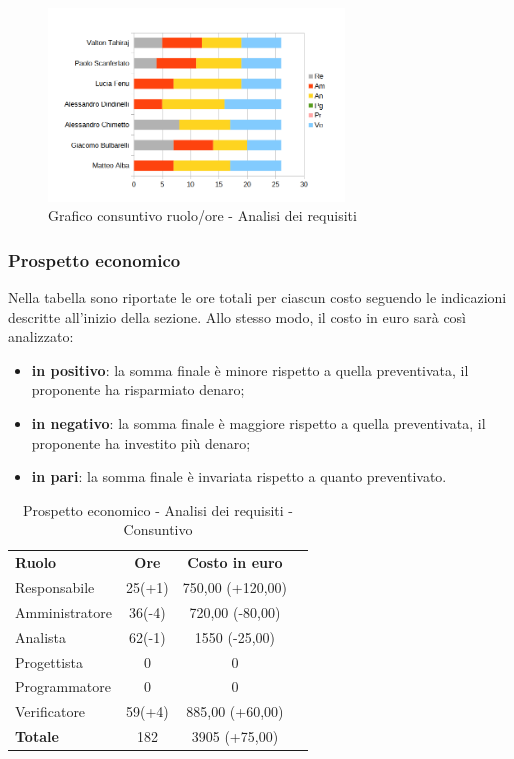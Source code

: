	\begin{figure} [h!]
	\centering
	\includegraphics[width=0.7\textwidth]{res/img/grafici/consuntivo-barre_ ore analisi requisiti.png}
	\caption{Grafico consuntivo ruolo/ore - Analisi dei requisiti} 
\end{figure}


\newpage
\subsubsection{Prospetto economico}
Nella tabella sono riportate le ore totali per ciascun costo seguendo le indicazioni descritte all'inizio della sezione.
Allo stesso modo, il costo in euro sarà così analizzato:
\begin{itemize}
	\item {\bfseries in positivo}: la somma finale è minore rispetto a quella preventivata, il proponente ha risparmiato denaro;
	\item {\bfseries in negativo}: la somma finale è maggiore rispetto a quella preventivata, il proponente ha investito più denaro;
	\item {\bfseries in pari}: la somma finale è invariata rispetto a quanto preventivato. \\
\end{itemize}
\begin{table} [h!]
	\begin{center}
		\begin{tabular} { m{3 cm} c c c  }
			\rowcolor{lightgray}
			\textbf{Ruolo} & \textbf{Ore} & \textbf{Costo in euro} \\
			Responsabile & 25(+1) & 750,00 (+120,00) \\
			Amministratore & 36(-4) & 720,00 (-80,00)  \\
			Analista & 62(-1) & 1550 (-25,00) \\
			Progettista & 0 & 0 \\
			Programmatore & 0 & 0  \\
			Verificatore & 59(+4) & 885,00 (+60,00)  \\
			\textbf{Totale} & 182  & 3905 (+75,00) \\
			
		\end{tabular}
		\caption{Prospetto economico - Analisi dei requisiti - Consuntivo}
	\end{center}
\end{table}

